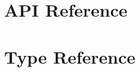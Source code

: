 \documentclass[a4paper]{article}
\begin{document}
\section{API Reference}

\section{Type Reference}












\printindex
\end{document}
